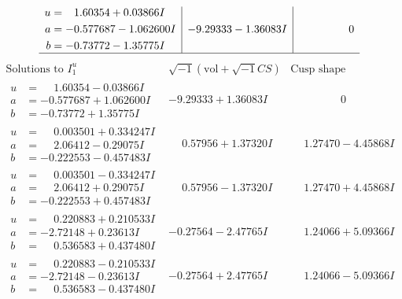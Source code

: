 \documentclass[1p]{elsarticle_modified}
\theoremstyle{definition}
\newcommand{\I}{\sqrt{-1}}
\begin{document}
$$\begin{array}{c|c|c}
\begin{aligned}
u &= \phantom{-}1.60354 + 0.03866 I \\
a &= -0.577687 - 1.062600 I \\
b &= -0.73772 - 1.35775 I\end{aligned}
 & -9.29333 - 1.36083 I & \phantom{-0.000000 } 0\\
 \hline 
 \end{array}$$\newpage$$\begin{array}{c|c|c}  
\text{Solutions to }I^u_{1}& \I (\text{vol} + \sqrt{-1}CS) & \text{Cusp shape}\\
 \hline 
\begin{aligned}
u &= \phantom{-}1.60354 - 0.03866 I \\
a &= -0.577687 + 1.062600 I \\
b &= -0.73772 + 1.35775 I\end{aligned}
 & -9.29333 + 1.36083 I & \phantom{-0.000000 } 0 \\ \hline\begin{aligned}
u &= \phantom{-}0.003501 + 0.334247 I \\
a &= \phantom{-}2.06412 - 0.29075 I \\
b &= -0.222553 - 0.457483 I\end{aligned}
 & \phantom{-}0.57956 + 1.37320 I & \phantom{-}1.27470 - 4.45868 I \\ \hline\begin{aligned}
u &= \phantom{-}0.003501 - 0.334247 I \\
a &= \phantom{-}2.06412 + 0.29075 I \\
b &= -0.222553 + 0.457483 I\end{aligned}
 & \phantom{-}0.57956 - 1.37320 I & \phantom{-}1.27470 + 4.45868 I \\ \hline\begin{aligned}
u &= \phantom{-}0.220883 + 0.210533 I \\
a &= -2.72148 + 0.23613 I \\
b &= \phantom{-}0.536583 + 0.437480 I\end{aligned}
 & -0.27564 - 2.47765 I & \phantom{-}1.24066 + 5.09366 I \\ \hline\begin{aligned}
u &= \phantom{-}0.220883 - 0.210533 I \\
a &= -2.72148 - 0.23613 I \\
b &= \phantom{-}0.536583 - 0.437480 I\end{aligned}
 & -0.27564 + 2.47765 I & \phantom{-}1.24066 - 5.09366 I \\ \hline\begin{aligned}

\end{aligned}
\end{array}$$
\end{document}
